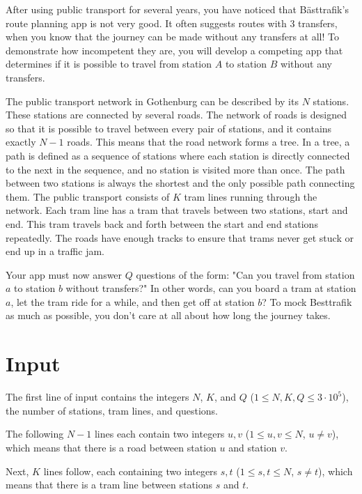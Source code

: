
\noindent
After using public transport for several years, you have noticed that Bästtrafik's route planning app is not very good.
It often suggests routes with 3 transfers, when you know that the journey can be made without any transfers at all! To demonstrate
how incompetent they are, you will develop a competing app that determines if it is possible to travel from station $A$ to
station $B$ without any transfers.

The public transport network in Gothenburg can be described by its $N$ stations. 
These stations are connected by several roads. 
The network of roads is designed so that it is possible to travel between every pair of stations, and it contains exactly $N-1$ roads. 
This means that the road network forms a tree. 
In a tree, a path is defined as a sequence of stations where each station is directly connected to the next in the sequence, 
and no station is visited more than once. The path between two stations is always the shortest and the only possible path connecting them. 
The public transport consists of $K$ tram lines running through the network.
Each tram line has a tram that travels between two stations, start and end. This tram travels back and forth between the start
and end stations repeatedly. The roads have enough tracks to ensure that trams never get stuck or end up in a traffic jam.

Your app must now answer $Q$ questions of the form: "Can you travel from station $a$ to station $b$
without transfers?" In other words, can you board a tram at station $a$, let the tram ride for a while, and then get off at
station $b$? To mock Besttrafik as much as possible, you don't care at all about how long the journey takes.

\section*{Input}
The first line of input contains the integers $N$, $K$, and $Q$ ($1 \le N, K, Q \le 3 \cdot 10^5$), the number of stations,
tram lines, and questions.

The following $N-1$ lines each contain two integers $u,v$ ($1 \leq u,v \leq N$, $u \neq v$),
which means that there is a road between station $u$ and station $v$. 

Next, $K$ lines follow, each containing two integers $s,t$ ($1 \leq s,t \leq N$, $s \neq t$), which
means that there is a tram line between stations $s$ and $t$.

